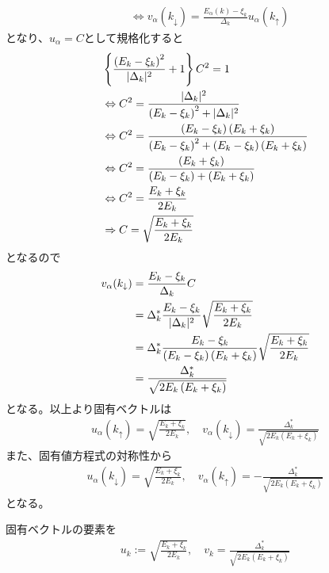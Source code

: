 \documentclass[dvipdfmx, 11pt, a4paper]{jsarticle}
\numberwithin{equation}{section}
\theoremstyle{definition}
\begin{document}
\begin{derivationBox}
\begin{align}
                &\Leftrightarrow v_\alpha (k_\downarrow) = \frac{E_\alpha(k) - \xi_k}{\Delta_k} u_\alpha (k_\uparrow) 
        \end{align}
        となり、$u_\alpha = C$として規格化すると
        \begin{align}
            &\left\{ \frac{\left(E_k - \xi_k\right)^2}{|\Delta_k|^2} + 1 \right\}C^2=1 \notag \\
            &\Leftrightarrow C^2 = \frac{|\Delta_k|^2}{\left(E_k - \xi_k\right)^2+|\Delta_k|^2} \notag \\
            &\Leftrightarrow C^2 = \frac{\left(E_k - \xi_k\right)\left(E_k + \xi_k\right)}{\left(E_k - \xi_k\right)^2+\left(E_k - \xi_k\right)\left(E_k + \xi_k\right)} \notag \\
            &\Leftrightarrow C^2 = \frac{\left(E_k + \xi_k\right)}{\left(E_k - \xi_k\right)+\left(E_k + \xi_k\right)} \notag \\
            &\Leftrightarrow C^2 = \frac{E_k + \xi_k}{2E_k} \notag \\
            &\Rightarrow C = \sqrt{\frac{E_k + \xi_k}{2E_k}}
        \end{align}
        となるので
        \begin{align}
            v_\alpha (k_\downarrow) &= \frac{E_k - \xi_k}{\Delta_k} C \notag \\
            &= \Delta_k^*\frac{E_k - \xi_k}{|\Delta_k|^2} \sqrt{\frac{E_k + \xi_k}{2E_k}} \notag \\
            &= \Delta_k^*\frac{E_k - \xi_k}{\left(E_k - \xi_k\right)\left(E_k + \xi_k\right)} \sqrt{\frac{E_k + \xi_k}{2E_k}} \notag \\
            &= \frac{\Delta_k^*}{\sqrt{2E_k\left(E_k + \xi_k\right)}}
        \end{align}
        となる。以上より固有ベクトルは
        \begin{align}
            u_\alpha(k_\uparrow) =\sqrt{\frac{E_k + \xi_k}{2E_k}},\quad v_\alpha(k_\downarrow) = \frac{\Delta_k^*}{\sqrt{2E_k\left(E_k + \xi_k\right)}}
        \end{align}
        また、固有値方程式の対称性から
        \begin{align}
            u_\alpha(k_\downarrow) =\sqrt{\frac{E_k + \xi_k}{2E_k}},\quad v_\alpha(k_\uparrow) =- \frac{\Delta_k^*}{\sqrt{2E_k\left(E_k + \xi_k\right)}}
        \end{align}
        となる。
    \end{derivationBox}
    固有ベクトルの要素を
    \begin{align}
        u_k := \sqrt{\frac{E_k+\xi_k}{2E_k}},\quad v_k = \frac{\Delta^*_k}{\sqrt{2E_k(E_k+\xi_k)}}
    \end{align}
\end{document}
